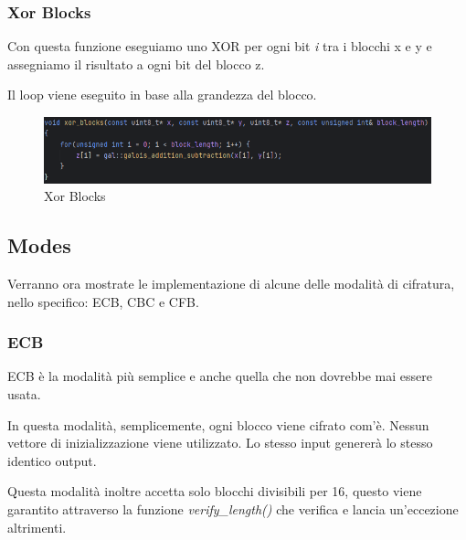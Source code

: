 \subsubsection{Xor Blocks}

 

\textsf{\small Con questa funzione eseguiamo uno XOR per ogni bit \emph{i} tra i blocchi x e y e assegniamo il risultato a ogni bit del blocco z. }

\textsf{\small Il loop viene eseguito in base alla grandezza del blocco.}

\begin{figure}[H]
	\centering
	\includegraphics[width=1\textwidth, height=1\textheight, keepaspectratio]{./images/code/cpp/key_expansion/xor_blocks.PNG}
	\caption{Xor Blocks}
	\label{fig:xor_blocks}
\end{figure}


\subsection{Modes}

   

\textsf{\small Verranno ora mostrate le implementazione di alcune delle modalità di cifratura, nello specifico: ECB, CBC e CFB.}

\subsubsection{ECB}


\textsf{\small ECB è la modalità più semplice e anche quella che non dovrebbe mai essere usata.} %

\textsf{\small In questa modalità, semplicemente, ogni blocco viene cifrato com'è. Nessun vettore di inizializzazione viene utilizzato. Lo stesso input genererà lo stesso identico output.}

\textsf{\small Questa modalità inoltre accetta solo blocchi divisibili per 16, questo viene garantito attraverso la funzione \emph{verify\_length()} che verifica e lancia un'eccezione altrimenti.}

